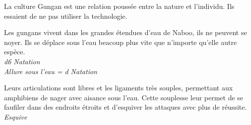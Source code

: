 La culture Gungan est une relation poussée entre la nature et l’individu. Ils essaient de ne pas utiliser la technologie.

\begin{description}[align=left]
\item [Aquatique] 			%
		Les gungans vivent dans les grandes étendues d’eau de Naboo, ils ne peuvent se noyer. Ils se déplace sous l’eau beacoup plus vite que n’importe qu’elle autre espèce.\\
		\emph{d6 Natation}\\
		\emph{Allure sous l’eau = d Natation}
		
\item [Mollusque] 			%
		Leurs articulations sont libres et les ligaments très souples, permettant aux amphibiens de nager avec aisance sous l’eau. Cette souplesse leur permet de se faufiler dans des endroits étroits et d’esquiver les attaques avec plus de réussite.\\
		\emph{Esquive}
\end{description}